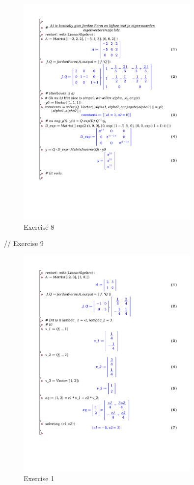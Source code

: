 \documentclass[a4paper]{article}
\begin{document}
\begin{figure}[H]
	\centering
	\includegraphics[width=0.8\textwidth]{exercises/huis_3_ex_8.pdf}
	\caption{Exercise 8}
	\label{fig:huis_3_ex_8}
\end{figure}

// Exercise 9


\begin{figure}[H]
	\centering
	\includegraphics[width=0.8\textwidth]{exercises/bord_3_ex_1.pdf}
	\caption{Exercise 1}
	\label{fig:bord_3_ex_1}
\end{figure}
\end{document}
